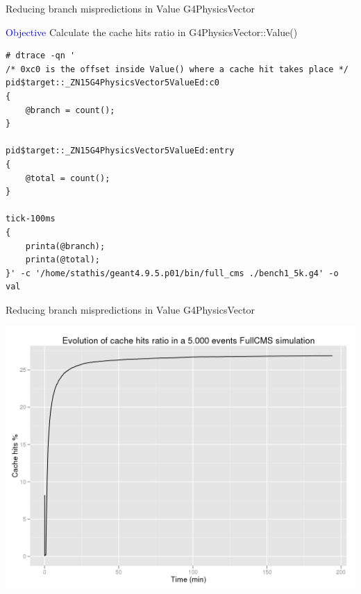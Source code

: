 \documentclass{beamer}
\begin{document}
\begin{frame}[fragile]{Reducing branch mispredictions in Value G4PhysicsVector}

\textcolor{blue}{Objective} Calculate the cache hits ratio in G4PhysicsVector::Value()

\lstset{basicstyle=\tiny\ttfamily}
\lstset{frame=single, columns=flexible}
\begin{lstlisting}
# dtrace -qn '
/* 0xc0 is the offset inside Value() where a cache hit takes place */
pid$target::_ZN15G4PhysicsVector5ValueEd:c0
{ 
    @branch = count();
}

pid$target::_ZN15G4PhysicsVector5ValueEd:entry
{
    @total = count();
}

tick-100ms
{
    printa(@branch);
    printa(@total);
}' -c '/home/stathis/geant4.9.5.p01/bin/full_cms ./bench1_5k.g4' -o val
\end{lstlisting}
\end{frame}


\begin{frame}{Reducing branch mispredictions in Value G4PhysicsVector}
\begin{center}
  \includegraphics[width=1.0\textwidth]{G4PhysicsVector-Value.png}
\end{center}
\end{frame}
\end{document}
